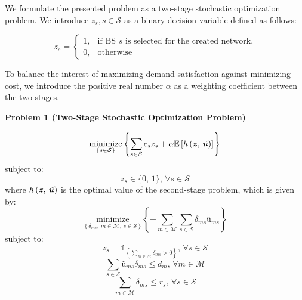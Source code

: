 \documentclass[onecolumn,draftcls]{IEEEtran}
\begin{document}

We formulate the presented problem as a two-stage stochastic optimization problem.  We introduce $z_s, s \in \mathcal{S}$ as a binary decision variable defined as follows:

\[ z_s =
	\begin{cases}
		1,& \text{if BS $s$ is selected for the created network,}\\
		0,& \text{otherwise}
	\end{cases}
\]

To balance the interest of maximizing demand satisfaction against minimizing cost, we introduce the positive real number $\alpha$ as a weighting coefficient between the two stages.

\vspace{5mm}
\noindent \textbf{Problem 1 (Two-Stage Stochastic Optimization Problem)}


\begin{equation} \label{eq:P1S1}
\underset{\left\{s \in \mathcal{S}\right\}}{\text{minimize}} \left\{ \sum_{s \in \mathcal{S}} c_s z_s + \alpha \mathbb{E}\left[ h\left( \textbf{\textit{z}},\, \textbf{\textit{\~u}} \right) \right] \right\}
\end{equation}
subject to:
\begin{equation} \label{eq:P1S1C1}
z_s \in \{0,\, 1\},\, \forall s \in \mathcal{S}
\end{equation}
where $h\left( \textbf{\textit{z}},\, \textbf{\textit{\~u}} \right)$ is the optimal value of the second-stage problem, which is given by:
\begin{equation} \label{eq:P1S2}
\underset{\left\{\delta_{ms},\, m \in \mathcal{M},\, s \in \mathcal{S} \right\}}{\text{minimize}} \left\{ - \sum_{m \in \mathcal{M}} \sum_{s \in \mathcal{S}} \delta_{ms} \textit{\~u}_{ms} \right\}
\end{equation}
subject to:
\begin{equation} \label{eq:P1S2C1}
z_s = \mathbb{1}_{\left\{\sum_{m \in \mathcal{M}} \delta_{ms} > 0 \right\}},\, \forall s \in \mathcal{S}
\end{equation}
\begin{equation} \label{eq:P1S2C2}
\sum_{s \in \mathcal{S}} \textit{\~u}_{ms} \delta_{ms} \leq d_m,\, \forall m \in \mathcal{M}
\end{equation}
\begin{equation} \label{eq:P1S2C3}
\sum_{m \in \mathcal{M}} \delta_{ms} \leq r_s,\, \forall s \in \mathcal{S}
\end{equation}
\end{document}
